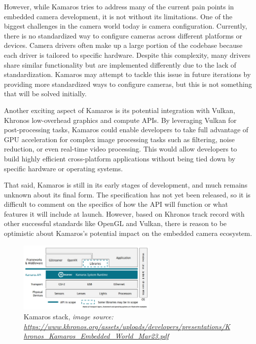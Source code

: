 However, while Kamaros tries to address many of the current pain points in
embedded camera development, it is not without its limitations. One of the
biggest challenges in the camera world today is camera configuration.
Currently, there is no standardized way to configure cameras across different
platforms or devices. Camera drivers often make up a large portion of the
codebase because each driver is tailored to specific hardware. Despite this
complexity, many drivers share similar functionality but are implemented
differently due to the lack of standardization. Kamaros may attempt to tackle
this issue in future iterations by providing more standardized ways to
configure cameras, but this is not something that will be solved initially.

Another exciting aspect of Kamaros is its potential integration with Vulkan,
Khronos low-overhead graphics and compute APIs. By leveraging Vulkan for
post-processing tasks, Kamaros could enable developers to take full advantage
of GPU acceleration for complex image processing tasks such as filtering,
noise reduction, or even real-time video processing. This would allow
developers to build highly efficient cross-platform applications without being
tied down by specific hardware or operating systems.

That said, Kamaros is still in its early stages of development, and much
remains unknown about its final form. The specification has not yet been
released, so it is difficult to comment on the specifics of how the API will
function or what features it will include at launch. However, based on
Khronos track record with other successful standards like OpenGL and Vulkan,
there is reason to be optimistic about Kamaros's potential impact on the
embedded camera ecosystem.

\begin{figure}
    \begin{center}
        \includegraphics[width=0.60\textwidth]{figures/kamaros_stack.png}
    \end{center}
    \caption[Kamaros stack]{Kamaros stack, \textit{image source: \url{https://www.khronos.org/assets/uploads/developers/presentations/Khronos\_Kamaros\_Embedded\_World\_Mar23.pdf}}}\label{fig:kamaros_stack}
\end{figure}

